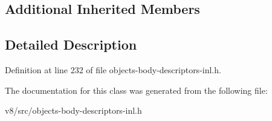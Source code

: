 \subsection*{Additional Inherited Members}


\subsection{Detailed Description}


Definition at line 232 of file objects-\/body-\/descriptors-\/inl.\+h.



The documentation for this class was generated from the following file\+:\begin{DoxyCompactItemize}
\item 
v8/src/objects-\/body-\/descriptors-\/inl.\+h\end{DoxyCompactItemize}
